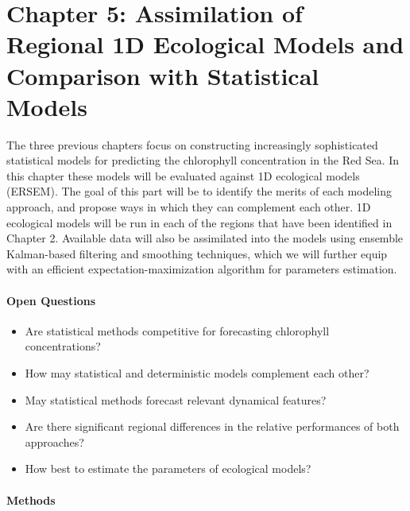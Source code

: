 \section{Chapter 5: Assimilation of Regional 1D Ecological Models and
Comparison with Statistical Models}

The three previous chapters focus on constructing increasingly sophisticated
statistical models for predicting the chlorophyll concentration in the Red Sea.
In this chapter these models will be evaluated against 1D ecological models
(ERSEM). The goal of this part will be to identify the merits of each modeling
approach, and propose ways in which they can complement each other. 1D
ecological models will be run in each of the regions that have been identified
in Chapter 2.  Available data will also be assimilated into the models using
ensemble Kalman-based filtering and smoothing techniques, which we will further
equip with an efficient expectation-maximization algorithm for parameters
estimation.

\paragraph{Open Questions}

\begin{itemize}

\item Are statistical methods competitive for forecasting chlorophyll
concentrations?

\item How may statistical and deterministic models complement each other?

\item May statistical methods forecast relevant dynamical features?

\item Are there significant regional differences in the relative performances
of both approaches?

\item How best to estimate the parameters of ecological models? 

\end{itemize}

\paragraph{Methods}

